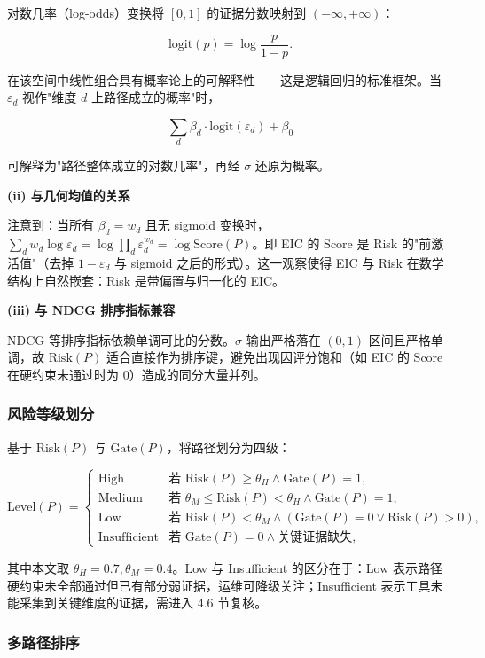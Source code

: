\documentclass[a4paper,12pt]{ctexart}
\begin{document}
对数几率（log-odds）变换将 $[0,1]$ 的证据分数映射到 $(-\infty, +\infty)$：

\[
\text{logit}(p) = \log\frac{p}{1-p}.
\]

在该空间中线性组合具有概率论上的可解释性——这是逻辑回归的标准框架。当 $\varepsilon_d$ 视作"维度 $d$ 上路径成立的概率"时，

\[
\sum_d \beta_d \cdot \text{logit}(\varepsilon_d) + \beta_0
\]

可解释为"路径整体成立的对数几率"，再经 $\sigma$ 还原为概率。

\textbf{(ii) 与几何均值的关系}

注意到：当所有 $\beta_d = w_d$ 且无 sigmoid 变换时，$\sum_d w_d \log \varepsilon_d = \log \prod_d \varepsilon_d^{w_d} = \log \text{Score}(P)$。即 EIC 的 Score 是 Risk 的"前激活值"（去掉 $1-\varepsilon_d$ 与 sigmoid 之后的形式）。这一观察使得 EIC 与 Risk 在数学结构上自然嵌套：Risk 是带偏置与归一化的 EIC。

\textbf{(iii) 与 NDCG 排序指标兼容}

NDCG 等排序指标依赖单调可比的分数。$\sigma$ 输出严格落在 $(0,1)$ 区间且严格单调，故 $\text{Risk}(P)$ 适合直接作为排序键，避免出现因评分饱和（如 EIC 的 Score 在硬约束未通过时为 0）造成的同分大量并列。

\subsubsection{风险等级划分}

基于 $\text{Risk}(P)$ 与 $\text{Gate}(P)$，将路径划分为四级：

\[
\text{Level}(P) = \begin{cases}
\text{High} & \text{若 } \text{Risk}(P) \geq \theta_H \wedge \text{Gate}(P) = 1, \\
\text{Medium} & \text{若 } \theta_M \leq \text{Risk}(P) < \theta_H \wedge \text{Gate}(P) = 1, \\
\text{Low} & \text{若 } \text{Risk}(P) < \theta_M \wedge (\text{Gate}(P) = 0 \vee \text{Risk}(P) > 0), \\
\text{Insufficient} & \text{若 } \text{Gate}(P) = 0 \wedge \text{关键证据缺失},
\end{cases}
\]

其中本文取 $\theta_H = 0.7, \theta_M = 0.4$。Low 与 Insufficient 的区分在于：Low 表示路径硬约束未全部通过但已有部分弱证据，运维可降级关注；Insufficient 表示工具未能采集到关键维度的证据，需进入 4.6 节复核。

\subsubsection{多路径排序}
\end{document}
